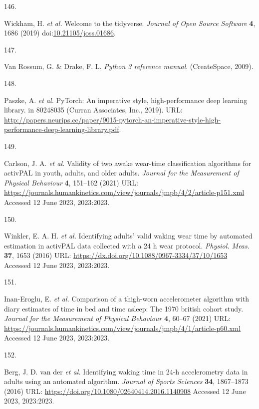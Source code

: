 \documentclass[
  9pt,
]{scrbook}
\newlength{\cslhangindent}
\newlength{\csllabelwidth}
\newlength{\cslentryspacingunit} %
\newenvironment{CSLReferences}[2] %
 {%
  \setlength{\parindent}{0pt}
  \ifodd #1
  \let\oldpar\par
  \def\par{\hangindent=\cslhangindent\oldpar}
  \fi
  \setlength{\parskip}{#2\cslentryspacingunit}
 }%
 {}
\newcommand{\CSLLeftMargin}[1]{\parbox[t]{\csllabelwidth}{#1}}
\newcommand{\CSLRightInline}[1]{\parbox[t]{\linewidth - \csllabelwidth}{#1}\break}
\begin{document}
\begin{CSLReferences}{0}{0}
\leavevmode{}%
\CSLLeftMargin{146. }%
\CSLRightInline{Wickham, H. \emph{et al.} Welcome to the tidyverse.
\emph{Journal of Open Source Software} \textbf{4}, 1686 (2019)
doi:\href{https://doi.org/10.21105/joss.01686}{10.21105/joss.01686}.}

\leavevmode{}%
\CSLLeftMargin{147. }%
\CSLRightInline{Van Rossum, G. \& Drake, F. L. \emph{Python 3 reference
manual}. (CreateSpace, 2009).}

\leavevmode{}%
\CSLLeftMargin{148. }%
\CSLRightInline{Paszke, A. \emph{et al.} PyTorch: An imperative style,
high-performance deep learning library. in 80248035 (Curran Associates,
Inc., 2019). URL:
\url{http://papers.neurips.cc/paper/9015-pytorch-an-imperative-style-high-performance-deep-learning-library.pdf}.}

\leavevmode{}%
\CSLLeftMargin{149. }%
\CSLRightInline{Carlson, J. A. \emph{et al.} Validity of two awake
wear-time classification algorithms for {activPAL} in youth, adults, and
older adults. \emph{Journal for the Measurement of Physical Behaviour}
\textbf{4}, 151--162 (2021) URL:
\url{https://journals.humankinetics.com/view/journals/jmpb/4/2/article-p151.xml}
Accessed 12 June 2023, 2023:2023.}

\leavevmode{}%
\CSLLeftMargin{150. }%
\CSLRightInline{Winkler, E. A. H. \emph{et al.} Identifying adults'
valid waking wear time by automated estimation in {activPAL} data
collected with a 24 h wear protocol. \emph{Physiol. Meas.} \textbf{37},
1653 (2016) URL: \url{https://dx.doi.org/10.1088/0967-3334/37/10/1653}
Accessed 12 June 2023, 2023:2023.}

\leavevmode{}%
\CSLLeftMargin{151. }%
\CSLRightInline{Inan-Eroglu, E. \emph{et al.} Comparison of a thigh-worn
accelerometer algorithm with diary estimates of time in bed and time
asleep: The 1970 british cohort study. \emph{Journal for the Measurement
of Physical Behaviour} \textbf{4}, 60--67 (2021) URL:
\url{https://journals.humankinetics.com/view/journals/jmpb/4/1/article-p60.xml}
Accessed 12 June 2023, 2023:2023.}

\leavevmode{}%
\CSLLeftMargin{152. }%
\CSLRightInline{Berg, J. D. van der \emph{et al.} Identifying waking
time in 24-h accelerometry data in adults using an automated algorithm.
\emph{Journal of Sports Sciences} \textbf{34}, 1867--1873 (2016) URL:
\url{https://doi.org/10.1080/02640414.2016.1140908} Accessed 12 June
2023, 2023:2023.}


\end{CSLReferences}
\end{document}
